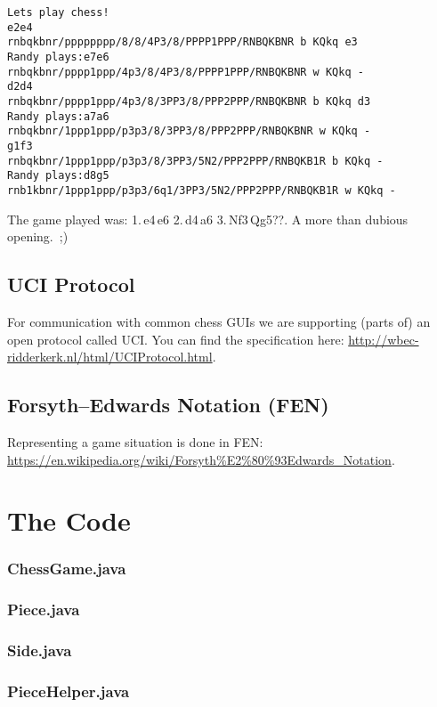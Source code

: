 \documentclass [12pt ,a4paper, english]{scrartcl}
\theoremstyle{plain}
\theoremstyle{definition}
\theoremstyle{remark}
\begin{document}
\begin{lstlisting}
Lets play chess!
e2e4
rnbqkbnr/pppppppp/8/8/4P3/8/PPPP1PPP/RNBQKBNR b KQkq e3
Randy plays:e7e6
rnbqkbnr/pppp1ppp/4p3/8/4P3/8/PPPP1PPP/RNBQKBNR w KQkq -
d2d4
rnbqkbnr/pppp1ppp/4p3/8/3PP3/8/PPP2PPP/RNBQKBNR b KQkq d3
Randy plays:a7a6
rnbqkbnr/1ppp1ppp/p3p3/8/3PP3/8/PPP2PPP/RNBQKBNR w KQkq -
g1f3
rnbqkbnr/1ppp1ppp/p3p3/8/3PP3/5N2/PPP2PPP/RNBQKB1R b KQkq -
Randy plays:d8g5
rnb1kbnr/1ppp1ppp/p3p3/6q1/3PP3/5N2/PPP2PPP/RNBQKB1R w KQkq -
\end{lstlisting}
The game played was: 1.\,e4\,e6 2.\,d4\,a6 3.\,Nf3\,Qg5??. A more than dubious opening.~;)

\subsection{UCI Protocol}
For communication with common chess GUIs we are supporting (parts of) an open protocol called UCI.
You can find the specification here: \url{http://wbec-ridderkerk.nl/html/UCIProtocol.html}.
\subsection{Forsyth–Edwards Notation (FEN)}
Representing a game situation is done in FEN: \url{https://en.wikipedia.org/wiki/Forsyth%E2%80%93Edwards_Notation}.


\section{The Code}

\subsubsection*{ChessGame.java}
\label{sec:chessgame}


\subsubsection*{Piece.java}


\subsubsection*{Side.java}


\subsubsection*{PieceHelper.java}

\end{document}
